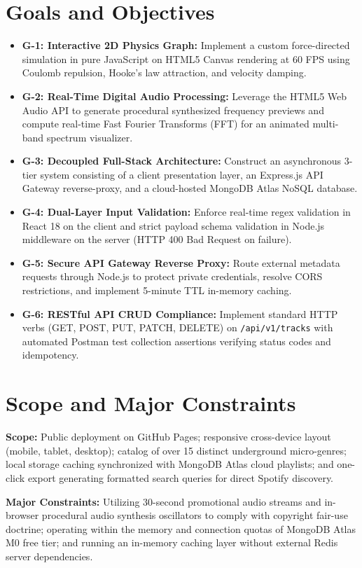 \documentclass[12pt,a4paper,oneside]{report}
\begin{document}
\section{Goals and Objectives}
\begin{itemize}
    \item \textbf{G-1: Interactive 2D Physics Graph:} Implement a custom force-directed simulation in pure JavaScript on HTML5 Canvas rendering at 60 FPS using Coulomb repulsion, Hooke's law attraction, and velocity damping.
    \item \textbf{G-2: Real-Time Digital Audio Processing:} Leverage the HTML5 Web Audio API to generate procedural synthesized frequency previews and compute real-time Fast Fourier Transforms (FFT) for an animated multi-band spectrum visualizer.
    \item \textbf{G-3: Decoupled Full-Stack Architecture:} Construct an asynchronous 3-tier system consisting of a client presentation layer, an Express.js API Gateway reverse-proxy, and a cloud-hosted MongoDB Atlas NoSQL database.
    \item \textbf{G-4: Dual-Layer Input Validation:} Enforce real-time regex validation in React 18 on the client and strict payload schema validation in Node.js middleware on the server (HTTP 400 Bad Request on failure).
    \item \textbf{G-5: Secure API Gateway Reverse Proxy:} Route external metadata requests through Node.js to protect private credentials, resolve CORS restrictions, and implement 5-minute TTL in-memory caching.
    \item \textbf{G-6: RESTful API CRUD Compliance:} Implement standard HTTP verbs (GET, POST, PUT, PATCH, DELETE) on \texttt{/api/v1/tracks} with automated Postman test collection assertions verifying status codes and idempotency.
\end{itemize}

\section{Scope and Major Constraints}
\textbf{Scope:} Public deployment on GitHub Pages; responsive cross-device layout (mobile, tablet, desktop); catalog of over 15 distinct underground micro-genres; local storage caching synchronized with MongoDB Atlas cloud playlists; and one-click export generating formatted search queries for direct Spotify discovery.

\noindent \textbf{Major Constraints:} Utilizing 30-second promotional audio streams and in-browser procedural audio synthesis oscillators to comply with copyright fair-use doctrine; operating within the memory and connection quotas of MongoDB Atlas M0 free tier; and running an in-memory caching layer without external Redis server dependencies.
\end{document}
